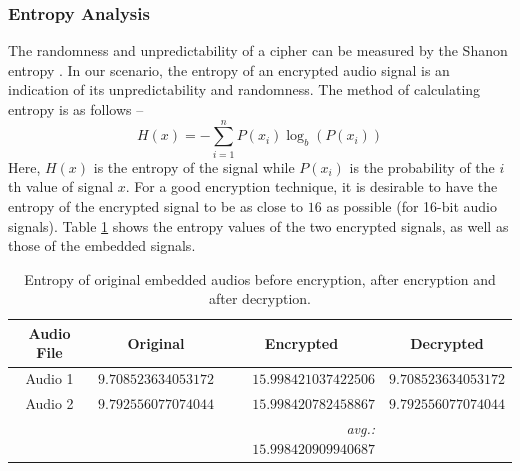 \documentclass[a4paper]{cas-sc}
\begin{document}
\subsubsection{Entropy Analysis}
The randomness and unpredictability of a cipher can be measured by the Shanon entropy \cite{shannon1948mathematical}. In our scenario, the entropy of an encrypted audio signal is an indication of its unpredictability and randomness. The method of calculating entropy is as follows --
\begin{equation}
    H(x)=-\sum_{i=1}^{n}P(x_i)\log_{b}(P(x_i))
\end{equation}
Here, $H(x)$ is the entropy of the signal while $P(x_i)$ is the probability of the $i$th value of signal $x$. For a good encryption technique, it is desirable to have the entropy of the encrypted signal to be as close to $16$ as possible (for 16-bit audio signals). Table \ref{table:entropy} shows the entropy values of the two encrypted signals, as well as those of the embedded signals.
\begin{table}[pos=h]
    \begin{center}
        \caption{Entropy of original embedded audios before encryption, after encryption and after decryption.}
        \begin{tabular}{ccrc}
            \hline
            \multicolumn{1}{c|}{Audio File} & Original            & \multicolumn{1}{c}{Encrypted}               & Decrypted           \\ \hline
            \multicolumn{1}{c|}{Audio 1}    & $9.708523634053172$ & $15.998421037422506$                        & $9.708523634053172$ \\
            \multicolumn{1}{c|}{Audio 2}    & $9.792556077074044$ & $15.998420782458867$                        & $9.792556077074044$ \\ \hline
                                            &                     & \textit{avg.:}$\mathbf{15.998420909940687}$ &
        \end{tabular}
        \label{table:entropy}
    \end{center}
\end{table}
\end{document}
